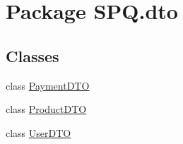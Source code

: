 \hypertarget{namespace_s_p_q_1_1dto}{}\section{Package S\+P\+Q.\+dto}
\label{namespace_s_p_q_1_1dto}
\subsection*{Classes}
\begin{DoxyCompactItemize}
\item 
class \mbox{\hyperlink{class_s_p_q_1_1dto_1_1_payment_d_t_o}{Payment\+D\+TO}}
\item 
class \mbox{\hyperlink{class_s_p_q_1_1dto_1_1_product_d_t_o}{Product\+D\+TO}}
\item 
class \mbox{\hyperlink{class_s_p_q_1_1dto_1_1_user_d_t_o}{User\+D\+TO}}
\end{DoxyCompactItemize}
